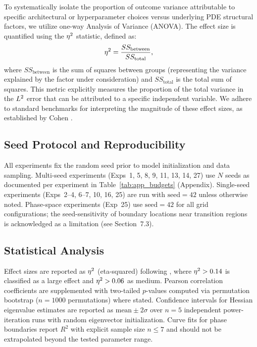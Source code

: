 To systematically isolate the proportion of outcome variance attributable to specific architectural or hyperparameter choices versus underlying PDE structural factors, we utilize one-way Analysis of Variance (ANOVA). The effect size is quantified using the $\eta^2$ statistic, defined as:
\begin{equation}
    \eta^2 = \frac{SS_{\text{between}}}{SS_{\text{total}}},
\end{equation}
where $SS_{\text{between}}$ is the sum of squares between groups (representing the variance explained by the factor under consideration) and $SS_{\text{total}}$ is the total sum of squares. This metric explicitly measures the proportion of the total variance in the $L^2$ error that can be attributed to a specific independent variable. We adhere to standard benchmarks for interpreting the magnitude of these effect sizes, as established by Cohen \cite{Cohen1988}.

\subsection{Seed Protocol and Reproducibility}

All experiments fix the random seed prior to model initialization and data sampling. Multi-seed experiments (Exps~1, 5, 8, 9, 11, 13, 14, 27) use $N$ seeds as documented per experiment in Table~\ref{tab:app_budgets} (Appendix). Single-seed experiments (Exps~2--4, 6--7, 10, 16, 25) are run with $\text{seed}=42$ unless otherwise noted. Phase-space experiments (Exp~25) use $\text{seed}=42$ for all grid configurations; the seed-sensitivity of boundary locations near transition regions is acknowledged as a limitation (see Section~7.3).

\subsection{Statistical Analysis}

Effect sizes are reported as $\eta^2$ (eta-squared) following \cite{Cohen1988}, where $\eta^2 > 0.14$ is classified as a large effect and $\eta^2 > 0.06$ as medium. Pearson correlation coefficients are supplemented with two-tailed $p$-values computed via permutation bootstrap ($n=1000$ permutations) where stated. Confidence intervals for Hessian eigenvalue estimates are reported as $\text{mean} \pm 2\sigma$ over $n=5$ independent power-iteration runs with random eigenvector initialization. Curve fits for phase boundaries report $R^2$ with explicit sample size $n \le 7$ and should not be extrapolated beyond the tested parameter range.

